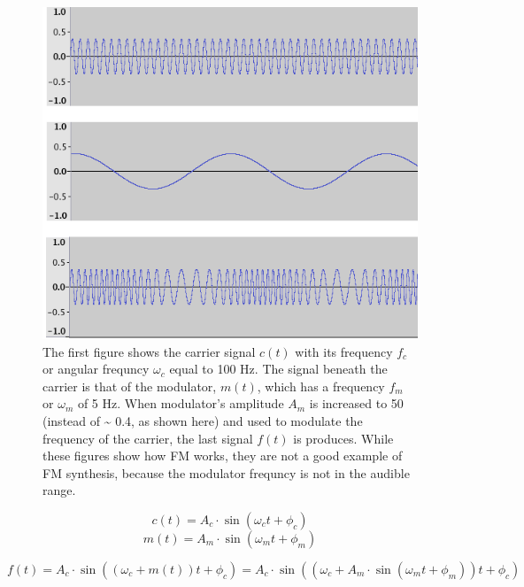 \documentclass[12pt,twoside]{report}
\begin{document}
\begin{figure}[]
  \includegraphics[scale=0.7]{img/fmlow}
  \caption{The first figure shows the carrier signal $c(t)$ with its frequency $f_{c}$ or angular frequncy $\omega_{c}$ equal to 100 Hz. The signal beneath the carrier is that of the modulator, $m(t)$, which has a frequency $f_{m}$ or $\omega_{m}$ of 5 Hz. When modulator's amplitude $A_{m}$ is increased to 50 (instead of \textasciitilde{} 0.4, as shown here) and used to modulate the frequency of the carrier, the last signal $f(t)$ is produces. While these figures show how FM works, they are not a good example of FM synthesis, because the modulator frequncy is not in the audible range.}
  \label{fig:fmlow}
\end{figure}

\begin{multicols}{2}
  \begin{equation}
    c(t) = A_{c} \cdot \sin(\omega_{c}t + \phi_{c})
  \end{equation}\break
  \begin{equation}
    m(t) = A_{m} \cdot \sin(\omega_{m}t + \phi_{m})
  \end{equation}
\end{multicols}

\begin{equation}
  f(t) = A_{c} \cdot \sin((\omega_{c} + m(t))t + \phi_{c}) = A_{c} \cdot \sin((\omega_{c} + A_{m} \cdot \sin(\omega_{m}t + \phi_{m}))t + \phi_{c})
  \label{eq:fm}
\end{equation}
\end{document}
